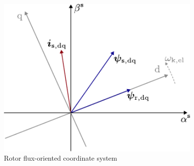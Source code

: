 \begin{frame}
\begin{columns}
\begin{column}{0.5\textwidth}
\begin{figure}
                \includegraphics[width=0.9\textwidth]{fig/lec06/K_coordinates_rotor_flux_orientation.pdf}
                \caption{Rotor flux-oriented coordinate system}
                \label{fig:K_coordinates_rotor_flux_orientation}
            \end{figure}
        \end{column}
    \end{columns}
\end{frame}

